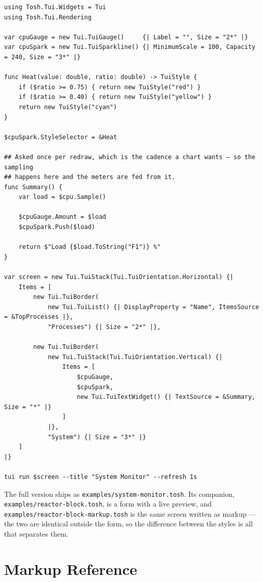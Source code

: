 \documentclass[11pt,a4paper,twoside,openany]{book}
\newcommand{\code}[1]{\texttt{\small #1}}
\begin{document}
\begin{lstlisting}
using Tosh.Tui.Widgets = Tui
using Tosh.Tui.Rendering

var cpuGauge = new Tui.TuiGauge()     {| Label = "", Size = "2*" |}
var cpuSpark = new Tui.TuiSparkline() {| MinimumScale = 100, Capacity = 240, Size = "3*" |}

func Heat(value: double, ratio: double) -> TuiStyle {
    if ($ratio >= 0.75) { return new TuiStyle("red") }
    if ($ratio >= 0.40) { return new TuiStyle("yellow") }
    return new TuiStyle("cyan")
}

$cpuSpark.StyleSelector = &Heat

## Asked once per redraw, which is the cadence a chart wants — so the sampling
## happens here and the meters are fed from it.
func Summary() {
    var load = $cpu.Sample()

    $cpuGauge.Amount = $load
    $cpuSpark.Push($load)

    return $"Load {$load.ToString("F1")} %"
}

var screen = new Tui.TuiStack(Tui.TuiOrientation.Horizontal) {|
    Items = [
        new Tui.TuiBorder(
            new Tui.TuiList() {| DisplayProperty = "Name", ItemsSource = &TopProcesses |},
            "Processes") {| Size = "2*" |},

        new Tui.TuiBorder(
            new Tui.TuiStack(Tui.TuiOrientation.Vertical) {|
                Items = [
                    $cpuGauge,
                    $cpuSpark,
                    new Tui.TuiTextWidget() {| TextSource = &Summary, Size = "*" |}
                ]
            |},
            "System") {| Size = "3*" |}
    ]
|}

tui run $screen --title "System Monitor" --refresh 1s
\end{lstlisting}

The full version ships as \code{examples/system-monitor.tosh}. Its companion,
\code{examples/reactor-block.tosh}, is a form with a live preview, and
\code{examples/reactor-block-markup.tosh} is the same screen written as markup ---
the two are identical outside the form, so the difference between the styles is
all that separates them.

\appendix
\chapter{Markup Reference}
\end{document}
